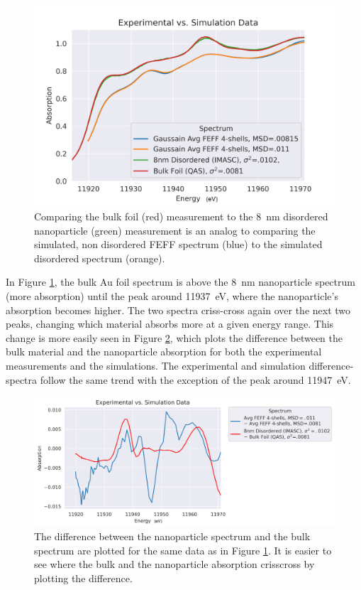 \begin{figure}[h]
	\centering
	\includegraphics[width=.75\linewidth]{Chapters/Figures/updated_bulk_8nm_disorder_experimental_theory_comparison.png}
	\caption[Simulation vs. Experimental XANES: Disorder Comparison]{Comparing the bulk foil (red) measurement to the 8~nm disordered nanoparticle (green) measurement is an analog to comparing the simulated, non disordered FEFF spectrum (blue) to the simulated disordered spectrum (orange).}
	\label{fig:avg-experimental-vs-simulation}
\end{figure}

In Figure \ref{fig:avg-experimental-vs-simulation}, the bulk Au foil spectrum is above the 8~nm nanoparticle spectrum (more absorption) until the peak around 11937~eV, where the nanoparticle's absorption becomes higher. The two spectra criss-cross again over the next two peaks, changing which material absorbs more at a given energy range. This change is more easily seen in Figure \ref{fig:avg-experimential-vs-simulation-difference}, which plots the difference between the bulk material and the nanoparticle absorption for both the experimental measurements and the simulations. The experimental and simulation difference-spectra follow the same trend with the exception of the peak around 11947~eV.


\begin{figure}[h!]
	\centering
	\includegraphics[width=\linewidth]{Chapters/Figures/experimental_vs_simulation_delta.png}
	\caption[Bulk-nanoparticle difference: Simulation vs. Experimental data]{The difference between the nanoparticle spectrum and the bulk spectrum are plotted for the same data as in Figure \ref{fig:avg-experimental-vs-simulation}. It is easier to see where the bulk and the nanoparticle absorption crisscross by plotting the difference.}
	\label{fig:avg-experimential-vs-simulation-difference}
\end{figure}

